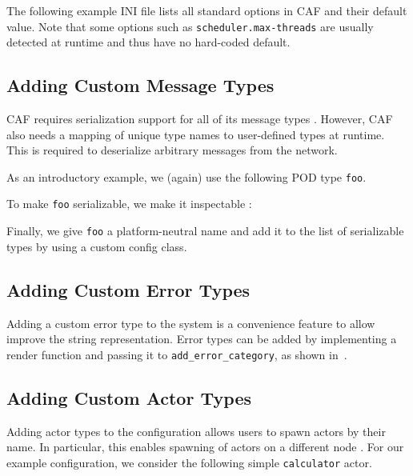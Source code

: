 The following example INI file lists all standard options in CAF and their
default value. Note that some options such as \lstinline^scheduler.max-threads^
are usually detected at runtime and thus have no hard-coded default.

\clearpage
{}

\clearpage
\subsection{Adding Custom Message Types}
\label{add-custom-message-type}

CAF requires serialization support for all of its message types
. However, CAF also needs a mapping of unique type names
to user-defined types at runtime. This is required to deserialize arbitrary
messages from the network.

As an introductory example, we (again) use the following POD type
\lstinline^foo^.


To make \lstinline^foo^ serializable, we make it inspectable
:


Finally, we give \lstinline^foo^ a platform-neutral name and add it to the list
of serializable types by using a custom config class.


\subsection{Adding Custom Error Types}

Adding a custom error type to the system is a convenience feature to allow
improve the string representation. Error types can be added by implementing a
render function and passing it to \lstinline^add_error_category^, as shown
in~.

\clearpage
\subsection{Adding Custom Actor Types \experimental}
\label{add-custom-actor-type}

Adding actor types to the configuration allows users to spawn actors by their
name. In particular, this enables spawning of actors on a different node
. For our example configuration, we consider the following
simple \lstinline^calculator^ actor.


